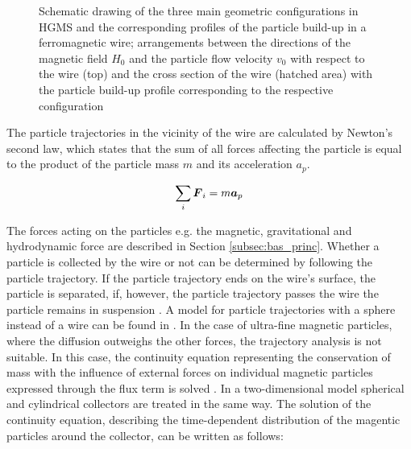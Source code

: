 \begin{figure}[h]
\centering

\caption[Geometric configurations in HGMS and particle build-up]{Schematic drawing of the three main geometric configurations in HGMS and the corresponding profiles of the particle build-up in a ferromagnetic wire; arrangements between the directions of the magnetic field $H_{0}$ and the particle flow velocity $v_{0}$ with respect to the wire (top) and the cross section of the wire (hatched area) with the particle build-up profile corresponding to the respective configuration \cite{svoboda2004magnetic}
\label{fig:hgms_config}
}
\end{figure}

The particle trajectories in the vicinity of the wire are calculated by Newton's second law, which states that the sum of all forces affecting the particle is equal to the product of the particle mass $m$ and its acceleration $a_{p}$. 

\begin{equation}
\label{eq:mag_force}
\centering
\sum_{i}\boldsymbol{F}_{i} = m\boldsymbol{a}_{p}
\end{equation}
 
The forces acting on the particles e.g. the magnetic, gravitational and hydrodynamic force are described in Section \ref{subsec:bas_princ}. Whether a particle is collected by the wire or not can be determined by following the particle trajectory. If the particle trajectory ends on the wire's surface, the particle is separated, if, however, the particle trajectory passes the wire the particle remains in suspension \cite{FranzrebHabil}. A model for particle trajectories with a sphere instead of a wire can be found in \cite{friedlaender1981particle}\cite{moyer1986filtration}. \newline 
In the case of ultra-fine magnetic particles, where the diffusion outweighs the other forces, the trajectory analysis is not suitable. In this case, the continuity equation representing the conservation of mass with the influence of external forces on individual magnetic particles expressed through the flux term is solved \cite{choomphon2017simulation}. In a two-dimensional model spherical and cylindrical collectors are treated in the same way. The solution of the continuity equation, describing the time-dependent distribution of the magentic particles around the collector, can be written as follows:     


